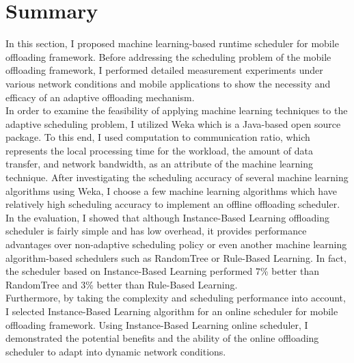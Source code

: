 \section{Summary}
\label{scheduler:summary}
%
In this section, I proposed machine learning-based runtime scheduler for
mobile offloading framework.
%
Before addressing the scheduling problem of the mobile offloading
framework, I performed detailed measurement experiments under various
network conditions and mobile applications to show the necessity and
efficacy of an adaptive offloading mechanism.\\
%
In order to examine the feasibility of applying machine learning
techniques to the adaptive scheduling problem, I utilized Weka which is
a Java-based open source package.
%
To this end, I used computation to communication ratio, which represents
the local processing time for the workload, the amount of data transfer,
and network bandwidth, as an attribute of the machine learning
technique.
%
After investigating the scheduling accuracy of several machine learning
algorithms using Weka, I choose a few machine learning algorithms which
have relatively high scheduling accuracy to implement an offline
offloading scheduler.
%
In the evaluation, I showed that although Instance-Based Learning 
offloading scheduler is fairly simple and has low overhead, it provides
performance advantages over non-adaptive scheduling policy or even
another machine learning algorithm-based schedulers such as RandomTree
or Rule-Based Learning.
%
In fact, the scheduler based on Instance-Based Learning
performed 7\% better than RandomTree and 3\% better than Rule-Based
Learning.\\
%
Furthermore, by taking the complexity and scheduling performance into
account, I selected Instance-Based Learning algorithm for an online
scheduler for mobile offloading framework.
%
Using Instance-Based Learning online scheduler, I demonstrated
the potential benefits and the ability of the online offloading
scheduler to adapt into dynamic network conditions.
%
